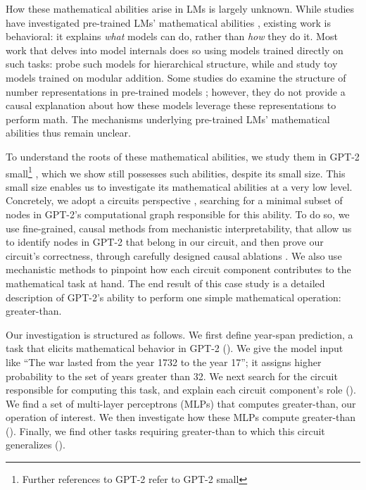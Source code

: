 \documentclass{article}
\begin{document}
    How these mathematical abilities arise in LMs is largely unknown. While studies have investigated pre-trained LMs' mathematical abilities \citep{Nogueira2021InvestigatingTL,qian2022limitations}, existing work is behavioral: it explains \textit{what} models can do, rather than \textit{how} they do it. Most work that delves into model internals does so using models trained directly on such tasks: \citet{hupkes2018visualisation} probe such models for hierarchical structure, while \citet{liu2022towards} and \citet{nanda2023progress} study toy models trained on modular addition. Some studies do examine the structure of number representations in pre-trained models \citep{naik-etal-2019-exploring,wallace-etal-2019-nlp}; however, they do not provide a causal explanation about how these models leverage these representations to perform math. The mechanisms underlying pre-trained LMs' mathematical abilities thus remain unclear.
    
    To understand the roots of these mathematical abilities, we study them in GPT-2 small\footnote{Further references to GPT-2 refer to GPT-2 small} \citep{radford2019language}, which we show still possesses such abilities, despite its small size. This small size enables us to investigate its mathematical abilities at a very low level. Concretely, we adopt a circuits perspective \citep{olah2020zoom,elhage2021mathematical}, searching for a minimal subset of nodes in GPT-2's computational graph responsible for this ability. To do so, we use fine-grained, causal methods from mechanistic interpretability, that allow us to identify nodes in GPT-2 that belong in our circuit, and then prove our circuit's correctness, through carefully designed causal ablations \citep{goldowskydill2023localizing}. We also use mechanistic methods to pinpoint how each circuit component contributes to the mathematical task at hand. The end result of this case study is a detailed description of GPT-2's ability to perform one simple mathematical operation: greater-than.
    
    Our investigation is structured as follows. We first define year-span prediction, a task that elicits mathematical behavior in GPT-2 (). We give the model input like ``The war lasted from the year 1732 to the year 17''; it assigns higher probability to the set of years greater than 32. We next search for the circuit responsible for computing this task, and explain each circuit component's role ().  We find a set of multi-layer perceptrons (MLPs) that computes greater-than, our operation of interest. We then investigate how these MLPs compute greater-than (). Finally, we find other tasks requiring greater-than to which this circuit generalizes ().
\end{document}
